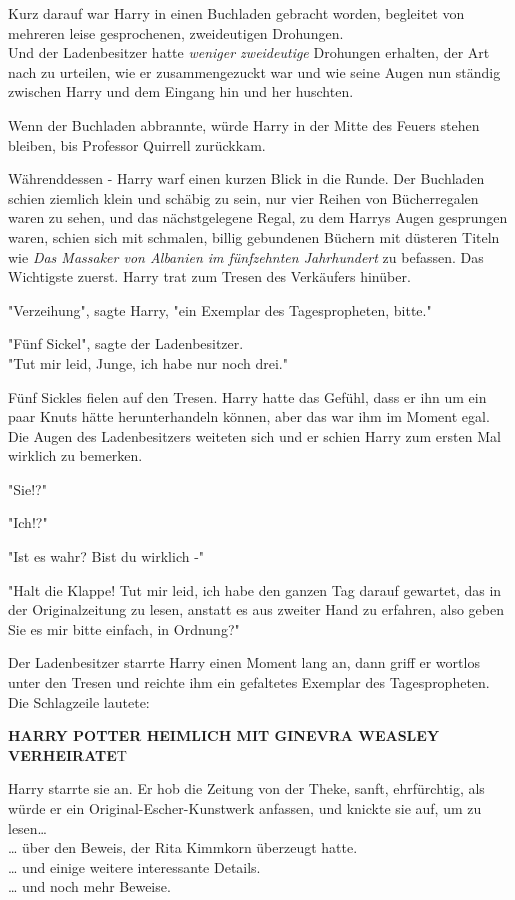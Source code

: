 {Kurz darauf war Harry in einen Buchladen gebracht worden, begleitet von mehreren leise gesprochenen, zweideutigen Drohungen.\\ Und der Ladenbesitzer hatte \emph{weniger zweideutige} Drohungen erhalten, der Art nach zu urteilen, wie er zusammengezuckt war und wie seine Augen nun ständig zwischen Harry und dem Eingang hin und her huschten.

Wenn der Buchladen abbrannte, würde Harry in der Mitte des Feuers stehen bleiben, bis Professor Quirrell zurückkam.

Währenddessen - Harry warf einen kurzen Blick in die Runde. Der Buchladen schien ziemlich klein und schäbig zu sein, nur vier Reihen von Bücherregalen waren zu sehen, und das nächstgelegene Regal, zu dem Harrys Augen gesprungen waren, schien sich mit schmalen, billig gebundenen Büchern mit düsteren Titeln wie \emph{Das Massaker von Albanien im fünfzehnten Jahrhundert} zu befassen. Das Wichtigste zuerst. Harry trat zum Tresen des Verkäufers hinüber.

"Verzeihung", sagte Harry, "ein Exemplar des Tagespropheten, bitte."

"Fünf Sickel", sagte der Ladenbesitzer.\\ "Tut mir leid, Junge, ich habe nur noch drei."

Fünf Sickles fielen auf den Tresen. Harry hatte das Gefühl, dass er ihn um ein paar Knuts hätte herunterhandeln können, aber das war ihm im Moment egal.\\ Die Augen des Ladenbesitzers weiteten sich und er schien Harry zum ersten Mal wirklich zu bemerken.

"Sie!?"

"Ich!?"

"Ist es wahr? Bist du wirklich -"

"Halt die Klappe! Tut mir leid, ich habe den ganzen Tag darauf gewartet, das in der Originalzeitung zu lesen, anstatt es aus zweiter Hand zu erfahren, also geben Sie es mir bitte einfach, in Ordnung?"

Der Ladenbesitzer starrte Harry einen Moment lang an, dann griff er wortlos unter den Tresen und reichte ihm ein gefaltetes Exemplar des Tagespropheten. Die Schlagzeile lautete:

\textbf{HARRY POTTER HEIMLICH MIT GINEVRA WEASLEY VERHEIRATE}T

Harry starrte sie an. Er hob die Zeitung von der Theke, sanft, ehrfürchtig, als würde er ein Original-Escher-Kunstwerk anfassen, und knickte sie auf, um zu lesen…\\ … über den Beweis, der Rita Kimmkorn überzeugt hatte.\\ … und einige weitere interessante Details.\\ … und noch mehr Beweise.

}
